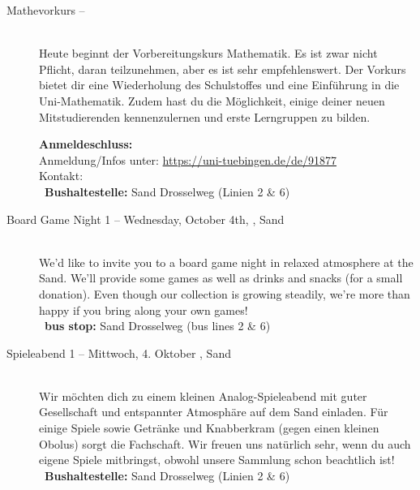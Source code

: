 \begin{description}
\ifbachelor
	\item[Mathevorkurs -- \mathedatum~\YEAR]~\\
	Heute beginnt der Vorbereitungskurs Mathematik. Es ist zwar nicht Pflicht, daran teilzunehmen, aber es ist sehr empfehlenswert.
	Der Vorkurs bietet dir eine Wiederholung des Schulstoffes und eine Einführung in die Uni-Mathematik. Zudem hast du die Möglichkeit, einige deiner neuen Mitstudierenden kennenzulernen und erste Lerngruppen zu bilden.

	\textbf{Anmeldeschluss:} \matheanmeldung\YEAR\\
	Anmeldung/Infos unter: \url{https://uni-tuebingen.de/de/91877}\\
	Kontakt: \texttt{\mathkontakt}\\
	\ifsommersemester
	~\textbf{Bushaltestelle:} Sand Drosselweg (Linien 2 \& 6) 
	\fi
\fi


\ifml
	\item[Board Game Night 1 -- Wednesday, October 4th, \YEAR, Sand]~\\%
	We'd like to invite you to a board game night in relaxed atmosphere at the Sand.
    We'll provide some games as well as drinks and snacks (for a small donation).
    Even though our collection is growing steadily, we're more than happy if you bring along your own games!\\
	~\textbf{bus stop:} Sand Drosselweg (bus lines 2 \& 6)
\else
    \item[Spieleabend 1 -- Mittwoch, 4. Oktober \YEAR, Sand]~\\%
	Wir möchten dich zu einem kleinen Analog-Spieleabend mit guter Gesellschaft und entspannter Atmosphäre auf dem Sand einladen.
    Für einige Spiele sowie Getränke und Knabberkram (gegen einen kleinen Obolus) sorgt die Fachschaft.
    Wir freuen uns natürlich sehr, wenn du auch eigene Spiele mitbringst, obwohl unsere Sammlung schon beachtlich ist!\\
	~\textbf{Bushaltestelle:} Sand Drosselweg (Linien 2 \& 6)
\fi

\ifbinfo \ifmaster \pagebreak  \fi \fi


\end{description}
